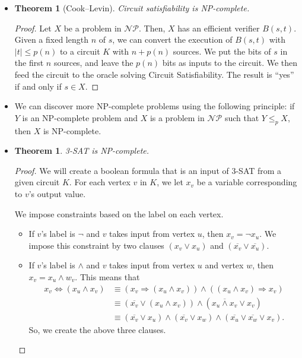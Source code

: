 \documentclass[10pt]{article}
\newtheorem{theorem}[lemma]{Theorem}
\newcommand{\Lra}{\Leftrightarrow}
\newcommand{\Ra}{\Rightarrow}
\begin{document}
\begin{itemize}
    \item \begin{theorem}[Cook--Levin]
      Circuit satisfiability is NP-complete.
    \end{theorem}
    \begin{proof}
      Let $X$ be a problem in $\mathcal{NP}$. Then, $X$ has an efficient verifier $B(s,t)$.
      Given a fixed length $n$ of $s$, we can convert the execution of $B(s,t)$ with $|t| \leq p(n)$
      to a circuit $K$ with $n + p(n)$ sources. We put the bits of $s$ in the first $n$ sources,
      and leave the $p(n)$ bits as inputs to the circuit. We then feed the circuit to the
      oracle solving Circuit Satisfiability. The result is ``yes'' if and only if $s \in X$.
    \end{proof}
    
    \item We can discover more NP-complete problems using the following principle: if $Y$ is an
      NP-complete problem and $X$ is a problem in $\mathcal{NP}$ such that $Y \leq_p X$, then
      $X$ is NP-complete.
      
    \item \begin{theorem}
      3-SAT is NP-complete.
    \end{theorem}
    \begin{proof}
      We will create a boolean formula that is an input of 3-SAT from a given circuit $K$.
      For each vertex $v$ in $K$, we let $x_v$ be a variable corresponding to $v$'s output 
      value.
      
      We impose constraints based on the label on each vertex.
      \begin{itemize}
        \item If $v$'s label is $\neg$ and $v$ takes input from vertex $u$, then $x_v = \neg x_u$.
          We impose this constraint by two clauses $(x_v \vee x_u)$ and $(\overline{x_v} \vee \overline{x_u})$.
          
        \item If $v$'s label is $\wedge$ and $v$ takes input from vertex $u$ and vertex $w$, 
          then $x_v = x_u \wedge w_v$. This means that 
          \begin{align*}
            x_v \Lra (x_u \wedge x_v) 
            &\equiv (x_v \Ra (x_u \wedge x_v)) \wedge ((x_u \wedge x_v) \Ra x_v)\\
            &\equiv (\overline{x_v} \vee (x_u \wedge x_v)) \wedge (\overline{x_u \wedge x_v} \vee x_v)\\
            &\equiv (\overline{x_v} \vee x_u) \wedge (\overline{x_v} \vee x_w) \wedge (\overline{x_u} \vee \overline{x_w} \vee x_v).
          \end{align*}
          So, we create the above three clauses.
          

\end{itemize}
\end{proof}
\end{itemize}
\end{document}
